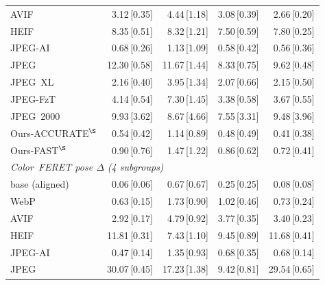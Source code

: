 \begin{tabular}{lrrrr}
    AVIF & 3.12\,{\scriptsize[0.35]} & 4.44\,{\scriptsize[1.18]} & 3.08\,{\scriptsize[0.39]} & 2.66\,{\scriptsize[0.20]} \\
    HEIF & 8.35\,{\scriptsize[0.51]} & 8.32\,{\scriptsize[1.21]} & 7.50\,{\scriptsize[0.59]} & 7.80\,{\scriptsize[0.25]} \\
    JPEG-AI & 0.68\,{\scriptsize[0.26]} & 1.13\,{\scriptsize[1.09]} & 0.58\,{\scriptsize[0.42]} & 0.56\,{\scriptsize[0.36]} \\
    JPEG & 12.30\,{\scriptsize[0.58]} & 11.67\,{\scriptsize[1.44]} & 8.33\,{\scriptsize[0.75]} & 9.62\,{\scriptsize[0.48]} \\
    JPEG~XL & 2.16\,{\scriptsize[0.40]} & 3.95\,{\scriptsize[1.34]} & 2.07\,{\scriptsize[0.66]} & 2.15\,{\scriptsize[0.50]} \\
    JPEG-FzT & 4.14\,{\scriptsize[0.54]} & 7.30\,{\scriptsize[1.45]} & 3.38\,{\scriptsize[0.58]} & 3.67\,{\scriptsize[0.55]} \\
    JPEG~2000 & 9.93\,{\scriptsize[3.62]} & 8.67\,{\scriptsize[4.66]} & 7.55\,{\scriptsize[3.31]} & 9.48\,{\scriptsize[3.96]} \\
    Ours-ACCURATE$^{\S}$ & 0.54\,{\scriptsize[0.42]} & 1.14\,{\scriptsize[0.89]} & 0.48\,{\scriptsize[0.49]} & 0.41\,{\scriptsize[0.38]} \\
    Ours-FAST$^{\S}$ & 0.90\,{\scriptsize[0.76]} & 1.47\,{\scriptsize[1.22]} & 0.86\,{\scriptsize[0.62]} & 0.72\,{\scriptsize[0.41]} \\
\midrule
\multicolumn{5}{l}{\emph{Color~FERET pose $\Delta$ (4 subgroups)}}\\
\midrule
    base (aligned) & 0.06\,{\scriptsize[0.06]} & 0.67\,{\scriptsize[0.67]} & 0.25\,{\scriptsize[0.25]} & 0.08\,{\scriptsize[0.08]} \\
    WebP & 0.63\,{\scriptsize[0.15]} & 1.73\,{\scriptsize[0.90]} & 1.02\,{\scriptsize[0.46]} & 0.73\,{\scriptsize[0.24]} \\
    AVIF & 2.92\,{\scriptsize[0.17]} & 4.79\,{\scriptsize[0.92]} & 3.77\,{\scriptsize[0.35]} & 3.40\,{\scriptsize[0.23]} \\
    HEIF & 11.81\,{\scriptsize[0.31]} & 7.43\,{\scriptsize[1.10]} & 9.45\,{\scriptsize[0.89]} & 11.68\,{\scriptsize[0.41]} \\
    JPEG-AI & 0.47\,{\scriptsize[0.14]} & 1.35\,{\scriptsize[0.93]} & 0.68\,{\scriptsize[0.35]} & 0.68\,{\scriptsize[0.14]} \\
    JPEG & 30.07\,{\scriptsize[0.45]} & 17.23\,{\scriptsize[1.38]} & 9.42\,{\scriptsize[0.81]} & 29.54\,{\scriptsize[0.65]} \\

\end{tabular}
